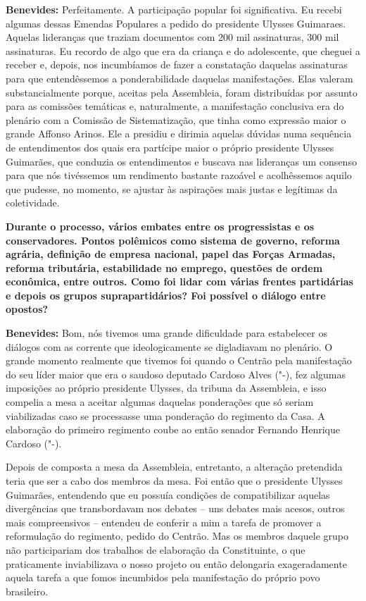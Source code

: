 \textbf{Benevides:} Perfeitamente. A participação popular foi
significativa. Eu recebi algumas dessas Emendas Populares a pedido do
presidente Ulysses Guimaraes. Aquelas lideranças que traziam documentos
com 200 mil assinaturas, 300 mil assinaturas. Eu recordo de algo que era
da criança e do adolescente, que cheguei a receber e, depois, nos
incumbíamos de fazer a constatação daquelas assinaturas para que
entendêssemos a ponderabilidade daquelas manifestações. Elas valeram
substancialmente porque, aceitas pela Assembleia, foram distribuídas por
assunto para as comissões temáticas e, naturalmente, a manifestação
conclusiva era do plenário com a Comissão de Sistematização, que tinha
como expressão maior o grande Affonso Arinos. Ele a presidiu e dirimia
aquelas dúvidas numa sequência de entendimentos dos quais era partícipe
maior o próprio presidente Ulysses Guimarães, que conduzia os
entendimentos e buscava nas lideranças um consenso para que nós
tivéssemos um rendimento bastante razoável e acolhêssemos aquilo que
pudesse, no momento, se ajustar às aspirações mais justas e legítimas da
coletividade.

\textbf{Durante o processo, vários embates entre os progressistas e os
conservadores. Pontos polêmicos como sistema de governo, reforma
agrária, definição de empresa nacional, papel das Forças Armadas,
reforma tributária, estabilidade no emprego, questões de ordem
econômica, entre outros. Como foi lidar com várias frentes partidárias e
depois os grupos suprapartidários? Foi possível o diálogo entre
opostos?}

\textbf{Benevides:} Bom, nós tivemos uma grande dificuldade para
estabelecer os diálogos com as corrente que ideologicamente se
digladiavam no plenário. O grande momento realmente que tivemos foi
quando o Centrão pela manifestação do seu líder maior que era o saudoso
deputado Cardoso Alves ("-), fez algumas imposições ao próprio
presidente Ulysses, da tribuna da Assembleia, e isso compelia a mesa a
aceitar algumas daquelas ponderações que só seriam viabilizadas caso se
processasse uma ponderação do regimento da Casa. A elaboração do
primeiro regimento coube ao então senador Fernando Henrique Cardoso
("-).

Depois de composta a mesa da Assembleia, entretanto, a alteração
pretendida teria que ser a cabo dos membros da mesa. Foi então que o
presidente Ulysses Guimarães, entendendo que eu possuía condições de
compatibilizar aquelas divergências que transbordavam nos debates -- uns
debates mais acesos, outros mais compreensivos -- entendeu de conferir a
mim a tarefa de promover a reformulação do regimento, pedido do Centrão.
Mas os membros daquele grupo não participariam dos trabalhos de
elaboração da Constituinte, o que praticamente inviabilizava o nosso
projeto ou então delongaria exageradamente aquela tarefa a que fomos
incumbidos pela manifestação do próprio povo brasileiro.

